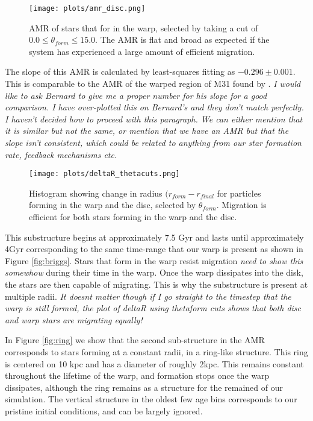 \documentclass[usenatbib, useAMS,usegraphicx]{mn2e}
\newcommand{\red}{\color{red}}
\begin{document}
\begin{figure}
   \centering
   \texttt{[image: plots/amr\_disc.png]}
   \caption{AMR of stars that for in the warp, selected by taking a cut of $0.0 \leq \theta_{form} \leq 15.0$. The AMR is flat and broad as expected if the system has experienced a large amount of efficient migration.  }
   \label{fig:amr_disc}
\end{figure}

The slope of this AMR is calculated by least-squares fitting as $-0.296 \pm 0.001 $. This is comparable to the AMR of the warped region of M31 found by \cite{Bernard2012}. \emph{ \red I would like to ask Bernard to give me a proper number for his slope for a good comparison. I have over-plotted this on Bernard's and they don't match perfectly. I haven't decided how to proceed with this paragraph. We can either mention that it is similar but not the same, or mention that we have an AMR but that the slope isn't consistent, which could be related to anything from our star formation rate, feedback mechanisms etc. }

\begin{figure}
   \centering
   \texttt{[image: plots/deltaR\_thetacuts.png]}
   \caption{ Histogram showing change in radius $(r_{form} - r_{final}$ for particles forming in the warp and the disc, selected by $\theta_{form}$. Migration is efficient for both stars forming in the warp and the disc.}
   \label{fig:deltaR_thetacuts}
\end{figure}

This substructure begins at approximately 7.5 Gyr and lasts until approximately 4Gyr corresponding to the same time-range that our warp is present as shown in Figure \ref{fig:briggs}. Stars that form in the warp resist migration \emph{ \red need to show this somewhow} during their time in the warp. Once the warp dissipates into the disk, the stars are then capable of migrating. This is why the substructure is present at multiple radii. \emph{ \red It doesnt matter though if I go straight to the timestep that the warp is still formed, the plot of deltaR using thetaform cuts shows that both disc and warp stars are migrating equally! }


In Figure \ref{fig:ring} we show that the second sub-structure in the AMR corresponds to stars forming at a constant radii, in a ring-like structure. This ring is centered on 10 kpc and has a diameter of roughly 2kpc. This remains constant throughout the lifetime of the warp, and formation stops once the warp dissipates, although the ring remains as a structure for the remained of our simulation. The vertical structure in the oldest few age bins corresponds to our pristine initial conditions, and can be largely ignored.
\end{document}
